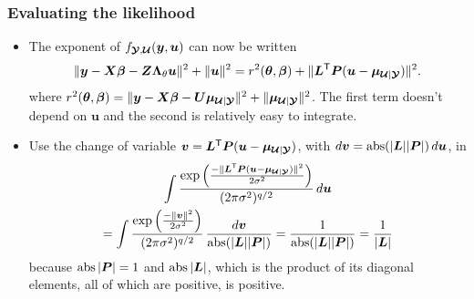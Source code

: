 \documentclass[dvipsnames,pdflatex,beamer]{beamer}
\newcommand{\bLt}{\ensuremath{\bm\Lambda_\theta}}
\begin{document}
\begin{frame}
  \frametitle{Evaluating the likelihood}
  \begin{itemize}
  \item The exponent of $f_{\bm{\mathcal{Y}},\bm{\mathcal{U}}}(\bm y,\bm u)$ can now be written
    \begin{displaymath}
      \|\bm y-\bm X\bm\beta-\bm Z\bLt\bm u\|^2+\|\bm u\|^2=
      r^2(\bm\theta,\bm\beta)+
      \|\bm L\trans\bm P(\bm u-\bm\mu_{\bc U|\bc Y})\|^2.
    \end{displaymath}
    where $r^2(\bm\theta,\bm\beta)=\|\bm y-\bm X\bm\beta-\bm
    U\bm\mu_{\bm{\mathcal{U}}|\bm{\mathcal{Y}}}\|^2+\|\bm\mu_{\bm{\mathcal{U}}|\bm{\mathcal{Y}}}\|^2$.  The first
    term doesn't depend on $\bm u$ and the second is relatively easy
    to integrate.
  \item Use the change of variable $\bm v=\bm L^\mathsf{T}\bm
    P(\bm u-\bm\mu_{\bm{\mathcal{U}}|\bm{\mathcal{Y}}})$, with $d\bm v=\operatorname{abs}(|\bm L||\bm P|)\,d\bm u$, in
    \begin{multline*}
      \int\frac{\exp\left(\frac{-\|\bm L^\mathsf{T}\bm P(\bm u-\bm\mu_{\bm{\mathcal{U}}|\bm{\mathcal{Y}}})\|^2}
          {2\sigma^2}\right)}
      {(2\pi\sigma^2)^{q/2}}\,d\bm u \\
      = \int\frac{\exp\left(\frac{-\|\bm
          v\|^2}{2\sigma^2}\right)}{(2\pi\sigma^2)^{q/2}}\,\frac{d\bm
        v}{\operatorname{abs}(|\bm L||\bm P|)} = \frac{1}{\operatorname{abs}(|\bm L||\bm
        P|)}=\frac{1}{|\bm L|}
    \end{multline*}
    because $\operatorname{abs}|\bm P|=1$ and $\operatorname{abs}|\bm L|$, which is the product of
    its diagonal elements, all of which are positive, is positive.
  \end{itemize}
\end{frame}
\end{document}
